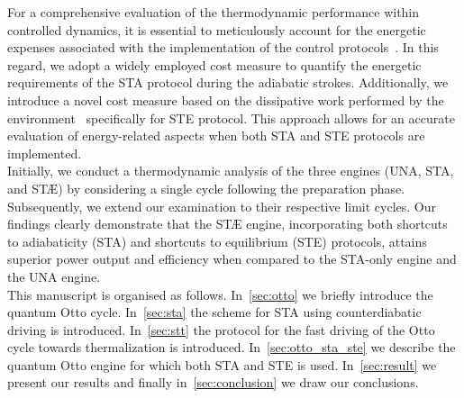 \documentclass[aps,pra,twocolumn,showpacs,showkeys,groupedaddress,nobalancelastpage,nofootinbib,floatfix,superscriptaddress,longbibliography]{revtex4-2}
\begin{document}
For a comprehensive evaluation of the thermodynamic performance within controlled dynamics, it is essential to meticulously account for the energetic expenses associated with the implementation of the control protocols~\cite{PhysRevE.99.032108,PhysRevE.98.032121,PhysRevE.99.022110,PhysRevResearch.2.023145}. In this regard, we adopt a widely employed cost measure to quantify the energetic requirements of the STA protocol during the adiabatic strokes. Additionally, we introduce a novel cost measure based on the dissipative work performed by the environment~\cite{PhysRevA.105.L040201} specifically for STE protocol. This approach allows for an accurate evaluation of energy-related aspects when both STA and STE protocols are implemented.\\

Initially, we conduct a thermodynamic analysis of the three engines (UNA, STA, and ST{\AE}) by considering a single cycle following the preparation phase. Subsequently, we extend our examination to their respective limit cycles. Our findings clearly demonstrate that the ST{\AE} engine, incorporating both shortcuts to adiabaticity (STA) and shortcuts to equilibrium (STE) protocols, attains superior power output and efficiency when compared to the STA-only engine and the UNA engine.\\

This manuscript is organised as follows. In~\cref{sec:otto} we briefly introduce the quantum Otto cycle. In~\cref{sec:sta} the scheme for STA using counterdiabatic driving is introduced. In~\cref{sec:stt} the protocol for the fast driving of the Otto cycle towards thermalization is introduced. In~\cref{sec:otto_sta_ste} we describe the quantum Otto engine for which both STA and STE is used. In~\cref{sec:result} we present our results and finally in~\cref{sec:conclusion} we draw our conclusions.
\end{document}

